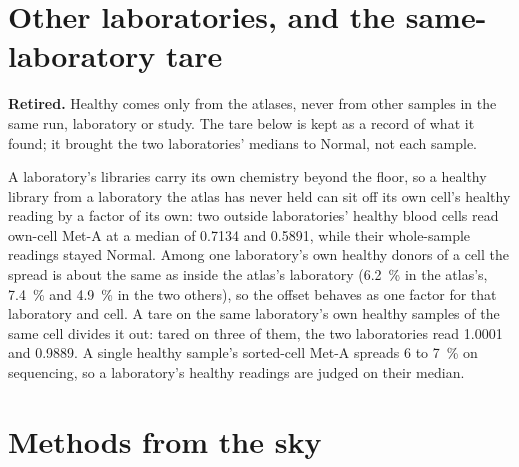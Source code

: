 \section{Other laboratories, and the same-laboratory tare}

\textbf{Retired.} Healthy comes only from the atlases, never from other samples in the same run, laboratory or study. The tare below is kept as a record of what it found; it brought the two laboratories' medians to Normal, not each sample.

A laboratory's libraries carry its own chemistry beyond the floor, so a healthy library from a laboratory the atlas has never held can sit
off its own cell's healthy reading by a factor of its own: two outside laboratories' healthy blood cells read own-cell Met-A at a median of
0.7134 and 0.5891, while their whole-sample readings stayed Normal. Among one laboratory's own healthy donors of a cell the spread is about
the same as inside the atlas's laboratory (6.2~\% in the atlas's, 7.4~\% and 4.9~\% in the two others), so the offset behaves as one factor
for that laboratory and cell. A tare on the same laboratory's own healthy samples of the same cell divides it out: tared on three of them,
the two laboratories read 1.0001 and 0.9889. A single healthy sample's sorted-cell Met-A spreads 6 to 7~\% on sequencing, so a laboratory's healthy readings
are judged on their median.

\section{Methods from the sky}

